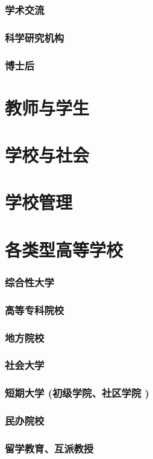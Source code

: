 \documentclass[UTF8]{../../ApplicationUniverse}
\begin{document}
    \subsubsection{学术交流}
    \subsubsection{科学研究机构}
    \subsubsection{博士后}
\section{教师与学生}
\section{学校与社会}
\section{学校管理}
\section{各类型高等学校}
    \subsubsection{综合性大学}
    \subsubsection{高等专科院校}
    \subsubsection{地方院校}
    \subsubsection{社会大学}
    \subsubsection{短期大学 (初级学院、社区学院 )}
    \subsubsection{民办院校}
    \subsubsection{留学教育、互派教授}
\end{document}
